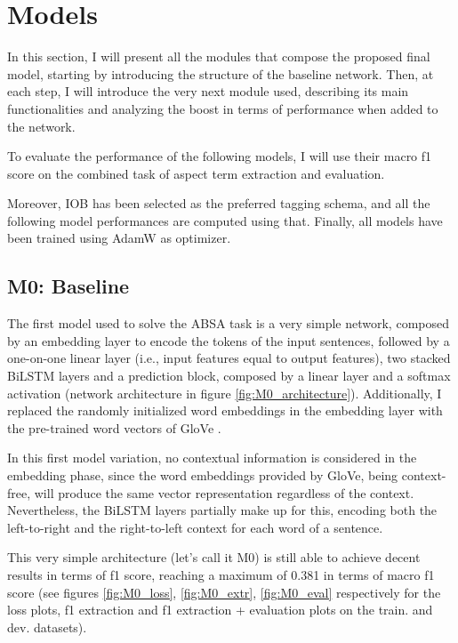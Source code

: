 \documentclass[11pt,a4paper]{article}
\begin{document}
	\section{Models}
	In this section, I will present all the modules that compose the proposed final
	model, starting by introducing the structure of the baseline network. Then, at
	each step, I will introduce the very next module used, describing its main
	functionalities and analyzing the boost in terms of performance when added to
	the network.
	
	To evaluate the performance of the following models, I will use their macro f1
	score on the combined task of aspect term extraction and evaluation.
	
	Moreover, IOB has been selected as the preferred tagging schema, and all the
	following model performances are computed using that. Finally, all models have
	been trained using AdamW as optimizer.
	
	\subsection{M0: Baseline}
	The first model used to solve the ABSA task is a very simple network, composed
	by an embedding layer to encode the tokens of the input sentences, followed by a
	one-on-one linear layer (i.e., input features equal to output features), two
	stacked BiLSTM layers and a prediction block, composed by a linear layer and a
	softmax activation (network architecture in figure \ref{fig:M0_architecture}).
	Additionally, I replaced the randomly initialized word embeddings in the
	embedding layer with the pre-trained word vectors of GloVe
	\citep{pennington2014glove}.
	
	In this first model variation, no contextual information is considered in the
	embedding phase, since the word embeddings provided by GloVe, being
	context-free, will produce the same vector representation regardless of the
	context. Nevertheless, the BiLSTM layers partially make up for this, encoding
	both the left-to-right and the right-to-left context for each word of a
	sentence.
	
	This very simple architecture (let's call it M0) is still able to achieve
	decent results in terms of f1 score, reaching a maximum of 0.381 in terms of
	macro f1 score (see figures \ref{fig:M0_loss}, \ref{fig:M0_extr},
	\ref{fig:M0_eval} respectively for the loss plots, f1 extraction and f1
	extraction + evaluation plots on the train. and dev. datasets).
	
\end{document}
